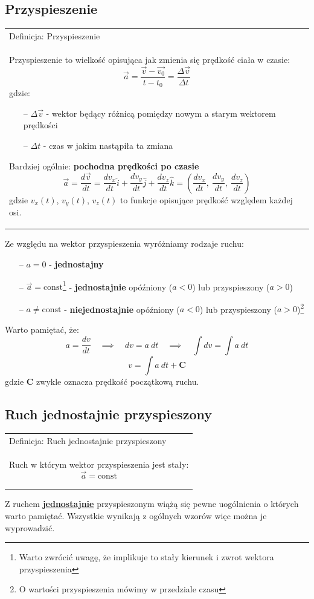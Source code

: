 \documentclass[a4paper]{article}
\newenvironment{definition}[2][Definicja]
    {
        \begin{center}
        \begin{tabular}{|p{1\textwidth}|}
        \hline
            #1: #2\\[2ex]
        \begin{em}
        \Large
    }
    { 
        \end{em}
        \\\hline
        \end{tabular} 
        \end{center}
    }
\begin{document}
    \subsection{\LARGE Przyspieszenie}
        \Large
        \begin{definition}{Przyspieszenie}
            Przyspieszenie to wielkość opisująca jak zmienia się prędkość ciała w czasie:
            \[\vec{a} = \frac{\vec{v} - \vec{v_0}}{t - t_0} = \frac{\Delta\vec{v}}{\Delta t}\]
            gdzie:
            \begin{itemize}
                \item[--] $\Delta\vec{v}$ - wektor będący różnicą pomiędzy nowym a starym wektorem prędkości
                \item[--] $\Delta t$ - czas w jakim nastąpiła ta zmiana 
            \end{itemize}
            Bardziej ogólnie: \textbf{pochodna prędkości po czasie}
            \[\vec{a} = \frac{d\vec{v}}{dt} = \frac{dv_x}{dt}\hat{i} + \frac{dv_y}{dt}\hat{j} + \frac{dv_z}{dt}\hat{k} 
            = \left (\frac{dv_x}{dt},\ \frac{dv_y}{dt},\ \frac{dv_z}{dt} \right )\]
            gdzie $v_x(t)$, $v_y(t)$, $v_z(t)$ to funkcje opisujące prędkość względem każdej osi.
        \end{definition}
        Ze względu na wektor przyspieszenia wyróżniamy rodzaje ruchu:
        \begin{itemize}
            \item[--] $a = 0$ - \textbf{jednostajny}
            \item[--] $\vec{a} = \text{const}$\footnote{\large Warto zwrócić uwagę, że implikuje to stały kierunek i zwrot wektora przyspieszenia} 
            - \textbf{jednostajnie} opóźniony ($a < 0$) lub przyspieszony ($a > 0$)
            \item[--] $a \neq \text{const}$ - \textbf{niejednostajnie} opóźniony ($a < 0$) lub przyspieszony ($a > 0$)\footnote{\large O wartości przyspieszenia mówimy w przedziale czasu}
        \end{itemize}
        Warto pamiętać, że:
        \[a = \frac{dv}{dt} \quad \implies \quad dv = a\ dt \quad \implies \quad \int dv = \int a\ dt\]
        \[v = \int a\ dt + \mathbf{C}\]
        gdzie $\mathbf{C}$ zwykle oznacza prędkość początkową ruchu.
    \pagebreak
    \subsection{\LARGE Ruch jednostajnie przyspieszony}
        \Large
        \begin{definition}{Ruch jednostajnie przyspieszony}
            Ruch w którym wektor przyspieszenia jest stały:
            \[\vec{a} = \text{const}\] 
        \end{definition}
        Z ruchem \underline{\textbf{jednostajnie}} przyspieszonym wiążą się pewne uogólnienia o których warto pamiętać.
        Wszystkie wynikają z ogólnych wzorów więc można je wyprowadzić.\\
\end{document}
